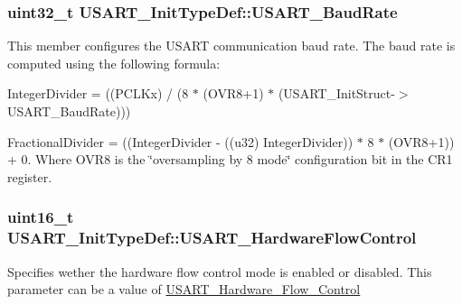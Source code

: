 \subsubsection[{\texorpdfstring{U\+S\+A\+R\+T\+\_\+\+Baud\+Rate}{USART_BaudRate}}]{\setlength{\rightskip}{0pt plus 5cm}uint32\+\_\+t U\+S\+A\+R\+T\+\_\+\+Init\+Type\+Def\+::\+U\+S\+A\+R\+T\+\_\+\+Baud\+Rate}\hypertarget{struct_u_s_a_r_t___init_type_def_a6f763cb0e6044f838ee764ce437997b2}{}\label{struct_u_s_a_r_t___init_type_def_a6f763cb0e6044f838ee764ce437997b2}
This member configures the U\+S\+A\+RT communication baud rate. The baud rate is computed using the following formula\+:
\begin{DoxyItemize}
\item Integer\+Divider = ((P\+C\+L\+Kx) / (8 $\ast$ (O\+V\+R8+1) $\ast$ (U\+S\+A\+R\+T\+\_\+\+Init\+Struct-\/$>$U\+S\+A\+R\+T\+\_\+\+Baud\+Rate)))
\item Fractional\+Divider = ((Integer\+Divider -\/ ((u32) Integer\+Divider)) $\ast$ 8 $\ast$ (O\+V\+R8+1)) + 0. Where O\+V\+R8 is the \char`\"{}oversampling by 8 mode\char`\"{} configuration bit in the C\+R1 register. 
\end{DoxyItemize}
\subsubsection[{\texorpdfstring{U\+S\+A\+R\+T\+\_\+\+Hardware\+Flow\+Control}{USART_HardwareFlowControl}}]{\setlength{\rightskip}{0pt plus 5cm}uint16\+\_\+t U\+S\+A\+R\+T\+\_\+\+Init\+Type\+Def\+::\+U\+S\+A\+R\+T\+\_\+\+Hardware\+Flow\+Control}\hypertarget{struct_u_s_a_r_t___init_type_def_a9996edf3bfd90c36f03b4075969703f5}{}\label{struct_u_s_a_r_t___init_type_def_a9996edf3bfd90c36f03b4075969703f5}
Specifies wether the hardware flow control mode is enabled or disabled. This parameter can be a value of \hyperlink{group___u_s_a_r_t___hardware___flow___control}{U\+S\+A\+R\+T\+\_\+\+Hardware\+\_\+\+Flow\+\_\+\+Control} 
